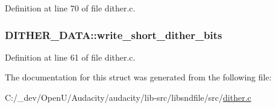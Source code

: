 Definition at line 70 of file dither.\+c.

\subsubsection[{\texorpdfstring{write\+\_\+short\+\_\+dither\+\_\+bits}{write_short_dither_bits}}]{ D\+I\+T\+H\+E\+R\+\_\+\+D\+A\+T\+A\+::write\+\_\+short\+\_\+dither\+\_\+bits}\hypertarget{struct_d_i_t_h_e_r___d_a_t_a_a13b47ae92931bfe46ce02f2e9d41afdb}{}\label{struct_d_i_t_h_e_r___d_a_t_a_a13b47ae92931bfe46ce02f2e9d41afdb}


Definition at line 61 of file dither.\+c.



The documentation for this struct was generated from the following file\+:\begin{DoxyCompactItemize}
\item 
C\+:/\+\_\+dev/\+Open\+U/\+Audacity/audacity/lib-\/src/libsndfile/src/\hyperlink{libsndfile_2src_2dither_8c}{dither.\+c}\end{DoxyCompactItemize}
